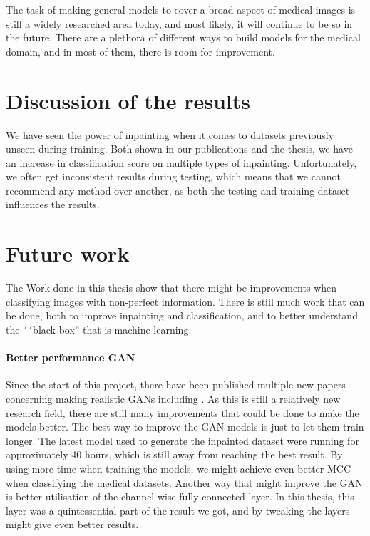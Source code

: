 The task of making general models to cover a broad aspect of medical images is still a widely researched area today, and most likely, it will continue to be so in the future. There are a  plethora of different ways to build models for the medical domain, and in most of them, there is room for improvement.

\section{Discussion of the results}
We have seen the power of inpainting when it comes to datasets previously unseen during training. Both shown in our publications and the thesis, we have an increase in classification score on multiple types of inpainting.
Unfortunately, we often get inconsistent results during testing, which means that we cannot recommend any method over another, as both the testing and training dataset influences the results.


\section{Future work}
The Work done in this thesis show that there might be improvements when classifying images with non-perfect information. There is still much work that can be done, both to improve inpainting and classification, and to better understand the ´´black box'' that is machine learning. 

\paragraph{Better performance GAN}
Since the start of this project, there have been published multiple new papers concerning making realistic GANs including \cite{DBLP:journals/corr/abs-1809-11096} \cite{DBLP:journals/corr/abs-1812-04948}. As this is still a relatively new research field, there are still many improvements that could be done to make the models better.
The best way to improve the GAN models is just to let them train longer. The latest model used to generate the inpainted dataset were running for approximately 40 hours, which is still away from reaching the best result. By using more time when training the models, we might achieve even better MCC when classifying the medical datasets.
Another way that might improve the GAN is better utilisation of the channel-wise fully-connected layer. In this thesis, this layer was a quintessential part of the result we got, and by tweaking the layers might give even better results.

